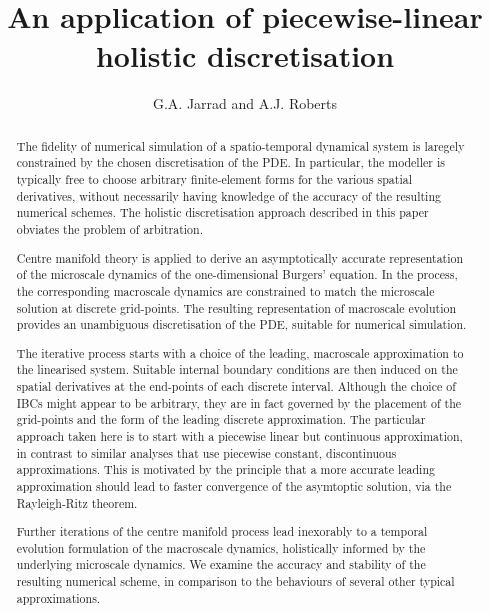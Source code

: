 \documentclass[12pt,a4paper]{article}
\title{An application of piecewise-linear holistic discretisation}
\author{G.A. Jarrad and A.J. Roberts}
\begin{document}
\maketitle

\begin{abstract}
The fidelity of numerical simulation of a spatio-temporal dynamical system is 
laregely constrained by the chosen discretisation of the PDE. 
In particular, the modeller is typically free to choose
arbitrary finite-element forms for the various spatial derivatives,
without necessarily having knowledge of the accuracy of the resulting numerical schemes.
The holistic discretisation approach described in this paper obviates the problem of arbitration. %

Centre manifold theory is applied to derive an asymptotically accurate
representation of the microscale dynamics of the one-dimensional Burgers' equation. 
In the process, the corresponding macroscale dynamics 
are constrained to match the microscale solution at discrete grid-points.
The resulting representation of macroscale evolution provides an unambiguous discretisation of the PDE,
suitable for numerical simulation. 

The iterative process starts with a choice of the leading, macroscale approximation to the linearised system.
Suitable internal boundary conditions are then induced on the spatial derivatives 
at the end-points of each discrete interval.
Although the choice of IBCs might appear to be arbitrary, they are in fact governed by the placement of the grid-points and the 
form of the leading discrete approximation.
The particular approach taken here is to start with a piecewise linear but continuous approximation,
in contrast to similar analyses that use piecewise constant, discontinuous approximations.
This is motivated by the principle that a more accurate leading approximation should lead to faster
convergence of the asymtoptic solution, via the Rayleigh-Ritz theorem.

Further iterations of the centre manifold process lead inexorably to a temporal evolution formulation of the macroscale dynamics,
holistically informed by the underlying microscale dynamics.  
We examine the accuracy and stability of the resulting numerical scheme, in comparison to
the behaviours of several other typical approximations.
\end{abstract}

\end{document}
